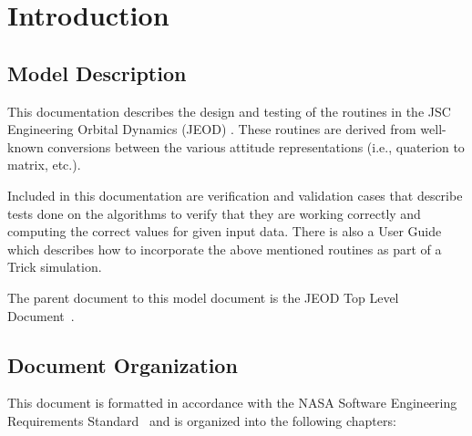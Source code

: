 \setcounter{chapter}{0}

\chapter{Introduction}\label{ch:intro}


\section{Model Description}

This documentation describes the design and testing of the routines in the JSC Engineering Orbital 
Dynamics (JEOD) \ModelDesc.  These routines 
are derived from well-known conversions between the various
attitude representations (i.e., quaterion to matrix, etc.).

Included in this documentation are verification and validation 
cases that describe tests done on the algorithms to verify that 
they are working correctly and computing the correct values for given 
input data. There is also a User Guide which describes how to incorporate the above 
mentioned routines as part of a Trick simulation.

The parent document to this model document is the
JEOD Top Level Document~\cite{dynenv:JEOD}.




\section{Document Organization}
This document is formatted in accordance with the 
NASA Software Engineering Requirements Standard~\cite{NASA:SWE} 
and is organized into the following chapters:

